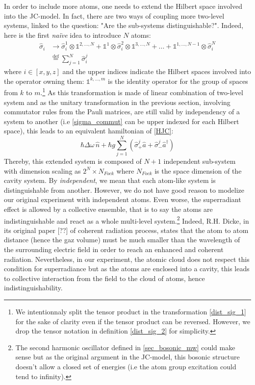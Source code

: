 \documentclass[11pt]{report}
\begin{document}
In order to include more atoms, one needs to extend the Hilbert space involved into the JC-model. In fact, there are two ways of coupling more two-level systems, linked to the question: "Are the sub-systems distinguishable?". Indeed, here is the first \textit{naïve} idea to introduce $N$ atoms:
\begin{align}
\label{dist_sig_1}
\hat{\sigma}_i &\rightarrow \hat{\sigma}_i^1 \otimes \mathbb{1}^{2,...,N} + \mathbb{1}^{1} \otimes \hat{\sigma}_i^2 \otimes \mathbb{1}^{3,...,N} + ... + \mathbb{1}^{1,...,N-1} \otimes \hat{\sigma}_i^N\\
\label{dist_sig_2}
&\stackrel{\text{def}}{=} \sum_{j=1}^{N} \hat{\sigma}_i^j
\end{align}
where $i \in \left[x,y,z\right]$ and the upper indices indicate the Hilbert spaces involved into the operator owning them: $\mathbb{1}^{k,...,m}$ is the identity operator for the group of spaces from $k$ to $m$.\footnote{We intentionnaly split the tensor product in the transformation \eqref{dist_sig_1} for the sake of clarity even if the tensor product can be reversed. However, we drop the tensor notation in definition \eqref{dist_sig_2} for simplicity.}
As this transformation is made of linear combination of two-level system and as the unitary transformation in the previous section, involving commutator rules from the Pauli matrices, are still valid by independency of a system to another (i.e \eqref{sigma_commut} can be upper indexed for each Hilbert space), this leads to an equivalent hamiltonian of \eqref{HJC}:
\begin{equation}
\hbar\Delta\omega\,\hat{n} + \hbar g \sum_{j=1}^{N} \left(\hat{\sigma}_+^j \hat{a} + \hat{\sigma}_-^j \hat{a}^{\dag} \right)
\end{equation}
Thereby, this extended system is composed of $N+1$ independent sub-system with dimension scaling as $2^N \times N_{Fock}$ where $N_{Fock}$ is the space dimension of the cavity system. By \textit{independent}, we mean that each atom-like system is distinguishable from another. However, we do not have good reason to modelize our original experiment with independent atoms. Even worse, the superradiant effect is allowed by a collective ensemble, that is to say the atoms are indistinguishable and react as a whole multi-level system.\footnote{The second harmonic oscillator defined in \eqref{sec_bosonic_mw} could make sense but as the original argument in the JC-model, this bosonic structure doesn't allow a closed set of energies (i.e the atom group excitation could tend to infinity).} Indeed, R.H. Dicke, in its original paper [??] of coherent radiation process, states that the atom to atom distance (hence the gaz volume) must be much smaller than the wavelength of the surrounding electric field in order to reach an enhanced and coherent radiation. Nevertheless, in our experiment, the atomic cloud does not respect this condition for superradiance but as the atoms are enclosed into a cavity, this leads to collective interaction from the field to the cloud of atoms, hence indistinguishability.
\end{document}
